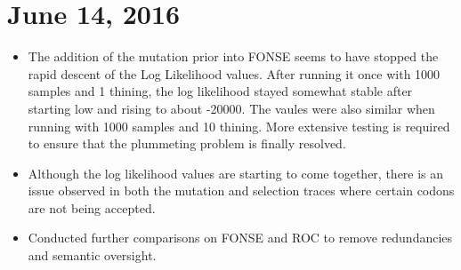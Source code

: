 \documentclass[12pt]{labbook}
\begin{document}
\section{June 14, 2016}

\begin{itemize}
    \item The addition of the mutation prior into FONSE seems to have stopped the rapid descent of the Log Likelihood values. After running it once with 1000 samples and 1 thining, the log likelihood stayed somewhat stable after starting low and rising to about -20000. The vaules were also similar when running with 1000 samples and 10 thining. More extensive testing is required to ensure that the plummeting problem is finally resolved.
    \item Although the log likelihood values are starting to come together, there is an issue observed in both the mutation and selection traces where certain codons are not being accepted. 
    \item Conducted further comparisons on FONSE and ROC to remove redundancies and semantic oversight.
\end{itemize}
\end{document}
